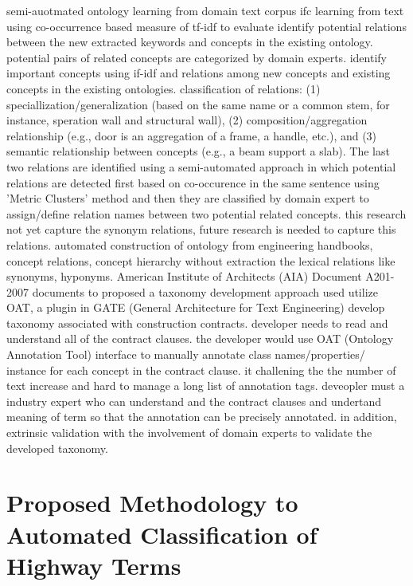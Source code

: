 \documentclass[Journal, BackFigs, DoubleSpace]{ascelike} %
\begin{document}
\cite{rezgui07} semi-auotmated ontology learning from domain text corpus ifc learning from text using co-occurrence based measure of tf-idf to evaluate identify potential relations between the new extracted keywords and concepts in the existing ontology. potential pairs of related concepts are categorized by domain experts. identify important concepts using if-idf and relations among new concepts and existing concepts in the existing ontologies. classification of relations: (1) speciallization/generalization (based on the same name or a common stem, for instance, speration wall and structural wall), (2) composition/aggregation relationship (e.g., door is an aggregation of a frame, a handle, etc.), and (3)  semantic relationship between concepts (e.g., a beam support a slab). The last two relations are identified using a semi-automated approach in which potential relations are detected first based on co-occurence in the same sentence using 'Metric Clusters' method and then they are classified by domain expert to assign/define relation names between two potential related concepts. this research not yet capture the synonym relations, future research is needed to capture this relations. 
\cite{hsieh11} automated construction of ontology from engineering handbooks, concept relations, concept hierarchy without extraction the lexical relations like synonyms, hyponyms.
\cite{niu15} American Institute of Architects (AIA) Document A201-2007 documents to proposed a taxonomy development approach used utilize OAT, a plugin in GATE (General Architecture for Text Engineering) develop taxonomy associated with construction contracts. developer needs to read and understand all of the contract clauses. the developer would use OAT (Ontology Annotation Tool) interface to manually annotate class names/properties/ instance for each concept in the contract clause. it challening the the number of text increase and hard to manage a long list of annotation tags. deveopler must a industry expert who can understand and the contract clauses and undertand meaning of term so that the annotation can be precisely annotated. in addition, extrinsic validation with the involvement of domain experts to validate the developed taxonomy. 
%
%
\section{Proposed Methodology to Automated Classification of Highway Terms} \label{sec:infralex}
\end{document}
